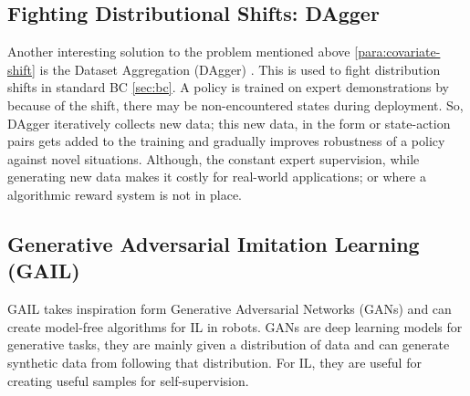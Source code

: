 \subsection{Fighting Distributional Shifts: DAgger}
Another interesting solution to the problem mentioned above \ref{para:covariate-shift} is the Dataset Aggregation (DAgger) \cite{ross2011reductionimitationlearningstructured}. This is used to fight distribution shifts in standard BC \ref{sec:bc}. A policy is trained on expert demonstrations by because of the shift, there may be non-encountered states during deployment. So, DAgger iteratively collects new data; this new data, in the form or state-action pairs gets added to the training and gradually improves robustness of a policy against novel situations. Although, the constant expert supervision, while generating new data makes it costly for real-world applications; or where a algorithmic reward system is not in place.

\subsection{Generative Adversarial Imitation Learning (GAIL)}\label{sec:gail}

GAIL \cite{ho2016generativeadversarialimitationlearning}  takes inspiration form Generative Adversarial Networks (GANs) \cite{goodfellow2014generativeadversarialnetworks} and can create model-free algorithms for IL in robots. GANs are deep learning models for generative tasks, they are mainly given a distribution of data and can generate synthetic data from following that distribution. For IL, they are useful for creating useful samples for self-supervision.